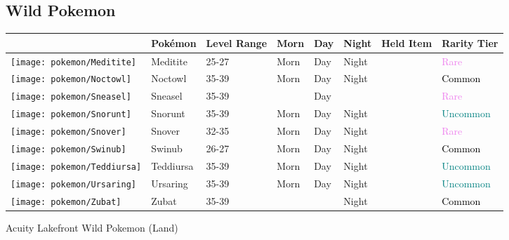 \subsection{Wild Pokemon}%
\label{subsec:WildPokemon}%
\begin{longtable}{||l l l l l l l l||}%
\hline%
&Pokémon&Level Range&Morn&Day&Night&Held Item&Rarity Tier\\%
\hline%
\endhead%
\hline%
\texttt{[image: pokemon/Meditite]}&Meditite&25{-}27&Morn&Day&Night&&\textcolor{violet}{%
Rare%
}\\%
\hline%
\texttt{[image: pokemon/Noctowl]}&Noctowl&35{-}39&Morn&Day&Night&&\textcolor{black}{%
Common%
}\\%
\hline%
\texttt{[image: pokemon/Sneasel]}&Sneasel&35{-}39&&Day&&&\textcolor{violet}{%
Rare%
}\\%
\hline%
\texttt{[image: pokemon/Snorunt]}&Snorunt&35{-}39&Morn&Day&Night&&\textcolor{teal}{%
Uncommon%
}\\%
\hline%
\texttt{[image: pokemon/Snover]}&Snover&32{-}35&Morn&Day&Night&&\textcolor{violet}{%
Rare%
}\\%
\hline%
\texttt{[image: pokemon/Swinub]}&Swinub&26{-}27&Morn&Day&Night&&\textcolor{black}{%
Common%
}\\%
\hline%
\texttt{[image: pokemon/Teddiursa]}&Teddiursa&35{-}39&Morn&Day&Night&&\textcolor{teal}{%
Uncommon%
}\\%
\hline%
\texttt{[image: pokemon/Ursaring]}&Ursaring&35{-}39&Morn&Day&Night&&\textcolor{teal}{%
Uncommon%
}\\%
\hline%
\texttt{[image: pokemon/Zubat]}&Zubat&35{-}39&&&Night&&\textcolor{black}{%
Common%
}\\%
\hline%
\end{longtable}%
\caption{Acuity Lakefront Wild Pokemon (Land)}